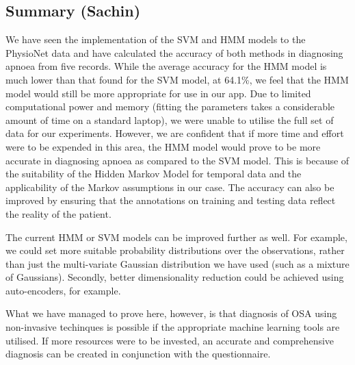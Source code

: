 \subsection{Summary (Sachin)}
\label{sec:mlExperimentsSummary}

We have seen the implementation of the SVM and HMM models to the PhysioNet data and have calculated the accuracy of both methods in diagnosing apnoea from five records. While the average accuracy for the HMM model is much lower than that found for the SVM model, at 64.1\%, we feel that the HMM model would still be more appropriate for use in our app. Due to limited computational power and memory (fitting the parameters takes a considerable amount of time on a standard laptop), we were unable to utilise the full set of data for our experiments. However, we are confident that if more time and effort were to be expended in this area, the HMM model would prove to be more accurate in diagnosing apnoea as compared to the SVM model. This is because of the suitability of the Hidden Markov Model for temporal data and the applicability of the Markov assumptions in our case. The accuracy can also be improved by ensuring that the annotations on training and testing data reflect the reality of the patient.

The current HMM or SVM models can be improved further as well. For example, we could set more suitable probability distributions over the observations, rather than just the multi-variate Gaussian distribution we have used (such as a mixture of Gaussians). Secondly, better dimensionality reduction could be achieved using auto-encoders, for example.

What we have managed to prove here, however, is that diagnosis of OSA using non-invasive techinques is possible if the appropriate machine learning tools are utilised. If more resources were to be invested, an accurate and comprehensive diagnosis can be created in conjunction with the questionnaire.